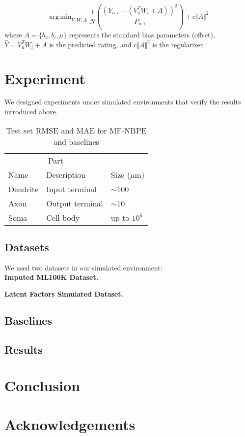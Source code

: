 \documentclass{article}
\DeclareMathOperator*{\argmin}{arg\,min}
\begin{document}
\[ \argmin_{V,W,A} \frac{1}{N}\left(\frac{(Y_{u,i}- (V_u^TW_i + A))^2}{P_{u,i}} \right) + c \Vert A \Vert^2\]
where $A = \{ b_u, b_i, \mu \}$ represents the standard bias parameters (offset), $\hat{Y} = V_u^TW_i + A$ is the predicted rating, and $c \Vert A \Vert^2$ is the regularizer.

\section{Experiment}
We designed experiments under simulated environments that verify the results introduced above.

\begin{table}
  \caption{Test set RMSE and MAE for MF-NBPE and baselines}
  \label{sample-table}
  \centering
  \begin{tabular}{lll}
    \toprule
    \multicolumn{2}{c}{Part}                   \\
    \cmidrule(r){1-2}
    Name     & Description     & Size ($\mu$m) \\
    \midrule
    Dendrite & Input terminal  & $\sim$100     \\
    Axon     & Output terminal & $\sim$10      \\
    Soma     & Cell body       & up to $10^6$  \\
    \bottomrule
  \end{tabular}
\end{table}


\subsection{Datasets}
We used two datasets in our simulated environment:\\

\textbf{Imputed ML100K Dataset.}

\textbf{Latent Factors Simulated Dataset.}

\subsection{Baselines}

\subsection{Results}

\section{Conclusion}

\section*{Acknowledgements}



\end{document}
